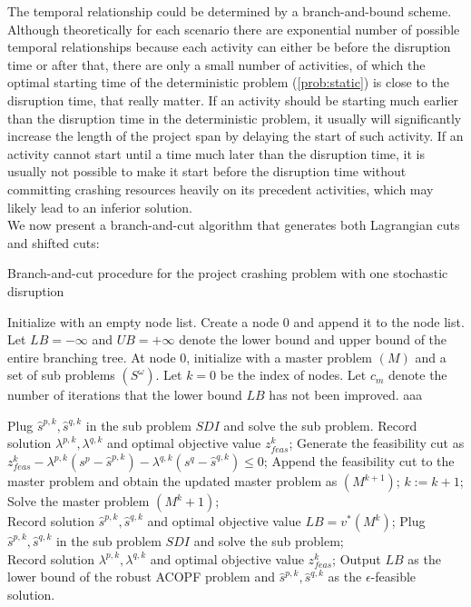 \documentclass[11pt]{article}
\newcommand{\noi}{\noindent}
\begin{document}
	\noi The temporal relationship could be determined by a branch-and-bound scheme. Although theoretically for each scenario there are exponential number of possible temporal relationships because each activity can either be before the disruption time or after that, there are only a small number of activities, of which the optimal starting time of the deterministic problem (\ref{prob:static}) is close to the disruption time, that really matter. If an activity should be starting much earlier than the disruption time in the deterministic problem, it usually will significantly increase the length of the project span by delaying the start of such activity. If an activity cannot start until a time much later than the disruption time, it is usually not possible to make it start before the disruption time without committing crashing resources heavily on its precedent activities, which may likely lead to an inferior solution.\\
	\newline
	We now present a branch-and-cut algorithm that generates both Lagrangian cuts and shifted cuts:
	\begin{algorithm}[H]
		\caption{Branch-and-cut procedure for the project crashing problem with one stochastic disruption}
		\label{alg:Cut}
		\begin{algorithmic}[1]
			\State Initialize with an empty node list. Create a node \(0\) and append it to the node list. Let \(LB = -\infty\) and \(UB = +\infty\) denote the lower bound and upper bound of the entire branching tree.
			\State At node \(0\), initialize with a master problem \((M)\) and a set of sub problems \((S^\omega)\). Let \(k = 0\) be the index of nodes. Let \(c_m\) denote the number of iterations that the lower bound \(LB\) has not been improved.
			\For{\(\omega \in \Omega\)}
				\State aaa
			
			
			\State Plug \(\hat{s}^{p,k}, \hat{s}^{q,k}\) in the sub problem \(SDI\) and solve the sub problem. Record solution \(\lambda^{p,k}, \lambda^{q,k}\) and optimal objective value \(z_{feas}^k\);
			\State Generate the feasibility cut as \(z_{feas}^k -\lambda^{p,k}(s^p - \hat{s}^{p,k}) - \lambda^{q,k} (s^q - \hat{s}^{q,k}) \leq 0\);
			\State Append the feasibility cut to the master problem and obtain the updated master problem as \((M^{k+1})\);
			\State \(k := k+1\);
			\State Solve the master problem \((M^k+1)\); \\
			\State Record solution \(\hat{s}^{p,k}, \hat{s}^{q,k}\) and optimal objective value \(LB = v^*(M^k)\); 
			\State Plug \(\hat{s}^{p,k}, \hat{s}^{q,k}\) in the sub problem \(SDI\) and solve the sub problem; \\
			\State Record solution \(\lambda^{p,k}, \lambda^{q,k}\) and optimal objective value \(z_{feas}^k\);
			\State Output \(LB\) as the lower bound of the robust ACOPF problem and \(\hat{s}^{p,k}, \hat{s}^{q,k}\) as the \(\epsilon\)-feasible solution.
		\end{algorithmic}
	\end{algorithm}
\end{document}
